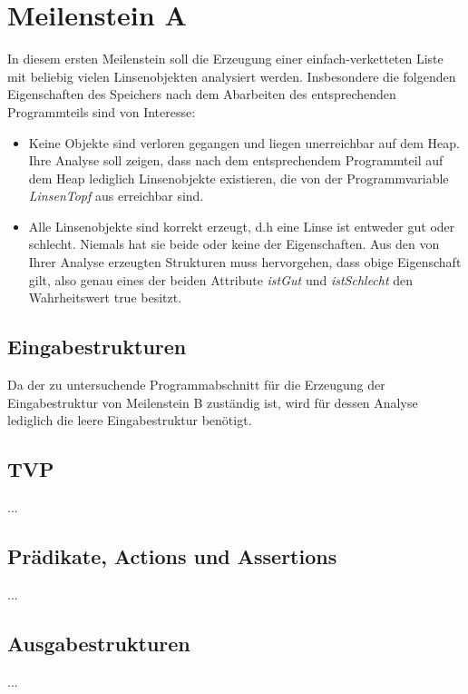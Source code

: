 \section{Meilenstein A}
In diesem ersten Meilenstein soll die Erzeugung einer einfach-verketteten Liste mit beliebig vielen Linsenobjekten analysiert werden. Insbesondere die folgenden Eigenschaften des Speichers nach dem Abarbeiten des entsprechenden Programmteils sind von Interesse:
\begin{itemize}
	\item Keine Objekte sind verloren gegangen und liegen unerreichbar auf dem Heap. Ihre Analyse soll zeigen, dass nach dem entsprechendem Programmteil auf dem Heap lediglich Linsenobjekte existieren, die von der Programmvariable \emph{LinsenTopf} aus erreichbar sind.
	\item Alle Linsenobjekte sind korrekt erzeugt, d.h eine Linse ist entweder gut oder schlecht. Niemals hat sie beide oder keine der Eigenschaften. Aus den von Ihrer Analyse erzeugten Strukturen muss hervorgehen, dass obige Eigenschaft gilt, also genau eines der beiden Attribute \emph{istGut} und \emph{istSchlecht} den Wahrheitswert true besitzt.
\end{itemize}


\subsection{Eingabestrukturen}
Da der zu untersuchende Programmabschnitt für die Erzeugung der Eingabestruktur von Meilenstein B zuständig ist, wird für dessen Analyse lediglich die leere Eingabestruktur benötigt. 


\subsection{TVP}
...


\subsection{Prädikate, Actions und Assertions}
...


\subsection{Ausgabestrukturen}
...